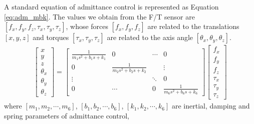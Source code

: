 \par
A standard equation of admittance control is represented as Equation \ref{eq:adm_mbk}. The values we obtain from the F/T sensor are $\left[f_x, f_y, f_z,\tau _x, \tau _y, \tau _z \right]$, whose forces $ \left[f_x, f_y, f_z\right]$ are related to the translations $ \left[x, y, z\right]$ and torques $ \left[\tau _x, \tau _y, \tau _z\right]$ are related to the axis angle $ \left[\theta _x,\theta _y,\theta _z\right]$. 
\begin{equation}
\label{eq:adm_mbk}
\begin{split}
\begin{bmatrix}
x \\
y \\
z \\
\theta _x \\
\theta _y \\
\theta _z 
\end{bmatrix}
=
\begin{bmatrix}
\frac{1}{m_1s^2+b_1s+k_1}&0  &\cdots  &0 \\ 
0 & \frac{1}{m_2s^2+b_2s+k_2}  & &\vdots \\ 
\vdots& &\ddots  & 0\\ 
0   &\cdots & 0 & \frac{1}{m_6s^2+b_6s+k_6}
\end{bmatrix}
\begin{bmatrix}
f_x \\
f_y \\
f_z \\
\tau _x \\
\tau _y \\
\tau _z 
\end{bmatrix}
\end{split}
\end{equation}
where $[m_1,m_2,\cdots,m_6]$, $[b_1,b_2,\cdots,b_6]$, $[k_1,k_2,\cdots,k_6]$ are inertial, damping and spring parameters of admittance control, 
